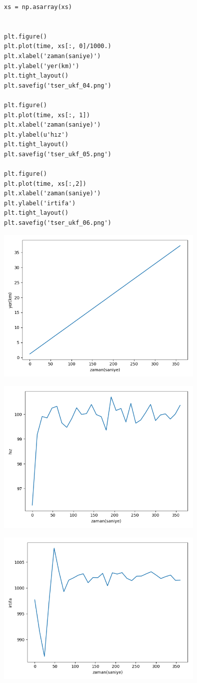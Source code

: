 \documentclass[12pt,fleqn]{article}\usepackage{../../common}
\begin{document}
\begin{verbatim}
xs = np.asarray(xs)


plt.figure()
plt.plot(time, xs[:, 0]/1000.)
plt.xlabel('zaman(saniye)')
plt.ylabel('yer(km)')
plt.tight_layout()
plt.savefig('tser_ukf_04.png')

plt.figure()
plt.plot(time, xs[:, 1])
plt.xlabel('zaman(saniye)')
plt.ylabel(u'hız')
plt.tight_layout()
plt.savefig('tser_ukf_05.png')

plt.figure()
plt.plot(time, xs[:,2])
plt.xlabel('zaman(saniye)')
plt.ylabel('irtifa')
plt.tight_layout()
plt.savefig('tser_ukf_06.png')
\end{verbatim}

\includegraphics[width=10cm]{tser_ukf_04.png}

\includegraphics[width=10cm]{tser_ukf_05.png}

\includegraphics[width=10cm]{tser_ukf_06.png}
\end{document}
